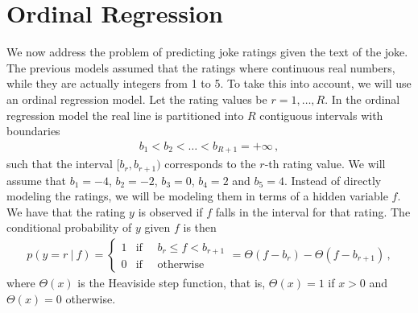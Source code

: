 \documentclass[10pt]{harvardml}
\theoremstyle{plain}
\begin{document}
\begin{enumerate}[label=\alph*.]
\begin{center}
\end{center}
\end{enumerate}



\newpage
\section*{Ordinal Regression}

We now address the problem of predicting joke ratings given the text of the
joke. The previous models assumed that the ratings where continuous real
numbers, while they are actually integers from 1 to 5. To take this into
account, we will use an ordinal regression model.
Let the rating values
be $r = 1,\ldots,R$. In the ordinal regression model the real line is
partitioned into $R$ contiguous intervals with boundaries
{\color{red}
\begin{align}
b_1 < b_2 < \ldots < b_{R+1} = +\infty\,,
\end{align}
}
such that the interval $[b_r,b_{r+1})$ corresponds to the $r$-th rating value.
We will assume that $b_1 = -4$, $b_2 = -2$, $b_3 = 0$, $b_4 = 2$ and $b_5 = 4$.
Instead of directly modeling the ratings, we will be modeling them in terms of a
hidden variable $f$. We have that the rating $y$ is observed
if $f$ falls in the interval for that rating. The conditional probability of
$y$ given $f$ is then
\begin{align}
p(y = r\ |\ f) =
\left\{
    \begin{array}{ll}
        1  & \mbox{if }\quad  b_r \leq f < b_{r+1} \\
        0 & \mbox{if } \quad \mbox{otherwise}
    \end{array}
\right.
= \Theta(f - b_r) - \Theta(f-b_{r+1})\,,
\end{align}
where $\Theta(x)$ is the Heaviside step function, that is, $\Theta(x)=1$ if
$x>0$ and $\Theta(x)=0$ otherwise.
\end{document}
